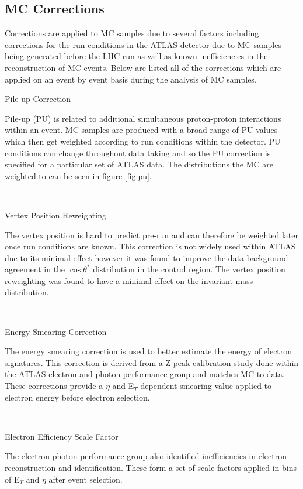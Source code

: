 \subsection{MC Corrections}
   \label{sec:correc}

   Corrections are applied to MC samples due to several factors including corrections for the run conditions in the ATLAS detector due to MC samples being generated before the LHC run as well as known inefficiencies in the reconstruction of MC events. Below are listed all of the corrections which are applied on an event by event basis during the analysis of MC samples.\\


   {\bf\raggedright Pile-up Correction}

   {\raggedright Pile-up (PU) is related to additional simultaneous proton-proton interactions within an event. MC samples are produced with a broad range of PU values which then get weighted according to run conditions within the detector. PU conditions can change throughout data taking and so the PU correction is specified for a particular set of ATLAS data. The distributions the MC are weighted to can be seen in figure \ref{fig:pu}.}\\

   {\bf\raggedright Vertex Position Reweighting}

   {\raggedright The vertex position is hard to predict pre-run and can therefore be weighted later once run conditions are known. This correction is not widely used within ATLAS due to its minimal effect however it was found to improve the data background agreement in the $\cos{\theta^{*}}$ distribution in the control region. The vertex position reweighting was found to have a minimal effect on the invariant mass distribution.}\\

   {\bf\raggedright Energy Smearing Correction}

   {\raggedright The energy smearing correction is used to better estimate the energy of electron signatures. This correction is derived from a Z peak calibration study \cite{ATLAS-CONF-2014-032} done within the ATLAS electron and photon performance group and matches MC to data. These corrections provide a $\eta$ and E$_{T}$ dependent smearing value applied to electron energy before electron selection.}\\

   {\bf\raggedright Electron Efficiency Scale Factor}

   {\raggedright The electron photon performance group also identified inefficiencies in electron reconstruction and identification. These form a set of scale factors applied in bins of E$_{T}$ and $\eta$ after event selection.}\\


